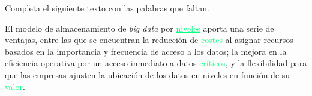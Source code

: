 
{
	Completa el siguiente texto con las palabras que faltan.
}\\

\begin{solution}
	El modelo de almacenamiento de \textit{big data} por \textcolor{springGreen}{\underline{niveles}} aporta una serie de ventajas, entre las que se encuentran la
	reducción de \textcolor{springGreen}{\underline{costes}} al asignar recursos basados en la importancia y frecuencia de acceso a los datos; la mejora
	en la eficiencia operativa por un acceso inmediato a datos \textcolor{springGreen}{\underline{críticos}}, y la flexibilidad para que las empresas
	ajusten la ubicación de los datos en niveles en función de su \textcolor{springGreen}{\underline{valor}}.
\end{solution}
